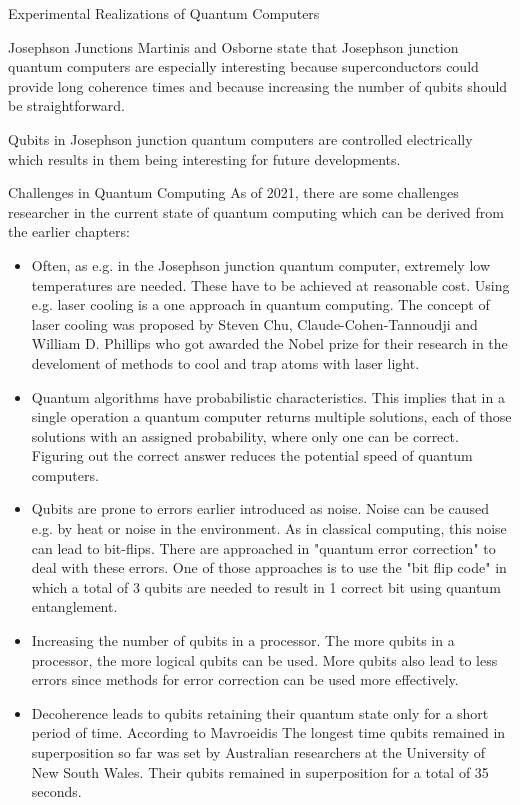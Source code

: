\documentclass[aps,preprintnumbers,twocolumn]{revtex4}
\begin{document}
\begin{section}{Experimental Realizations of Quantum Computers}
\begin{subsection}{Josephson Junctions}
Martinis and Osborne state \cite[p.3]{martinis} that Josephson junction quantum computers are especially interesting because superconductors could provide long coherence times and because increasing the number of qubits should be straightforward. 

Qubits in Josephson junction quantum computers are controlled electrically which results in them being interesting for future developments.
\end{subsection}

\begin{section}{Challenges in Quantum Computing}
As of 2021, there are some challenges researcher in the current state of quantum computing which can be derived from the earlier chapters: 

\begin{itemize}
    \item Often, as e.g. in the Josephson junction quantum computer, extremely low temperatures are needed. These have to be achieved at reasonable cost. Using e.g. laser cooling is a one approach in quantum computing. The concept of laser cooling was proposed by Steven Chu, Claude-Cohen-Tannoudji and William D. Phillips who got awarded the Nobel prize for their research in the develoment of methods to cool and trap atoms with laser light.
    \item Quantum algorithms have probabilistic characteristics. 
    This implies that in a single operation a quantum computer returns multiple solutions, each of those solutions with an assigned probability, where only one can be correct. 
    Figuring out the correct answer reduces the potential speed of quantum computers.
    \item Qubits are prone to errors earlier introduced as noise. 
    Noise can be caused e.g. by heat or noise in the environment. 
    As in classical computing, this noise can lead to bit-flips. There are approached in "quantum error correction" to deal with these errors. 
    One of those approaches is to use the "bit flip code" in which a total of 3 qubits are needed to result in 1 correct bit using quantum entanglement.  
    \item Increasing the number of qubits in a processor. The more qubits in a processor, the more logical qubits can be used. More qubits also lead to less errors since methods for error correction can be used more effectively.
    \item Decoherence leads to qubits retaining their quantum state only for a short period of time. 
    According to Mavroeidis \cite[p.3]{DBLP:journals/corr/abs-1804-00200} The longest time qubits remained in superposition so far was set by Australian researchers at the University of New South Wales. 
    Their qubits remained in superposition for a total of 35 seconds.
\end{itemize}

\end{section}

\end{section}
\end{document}
